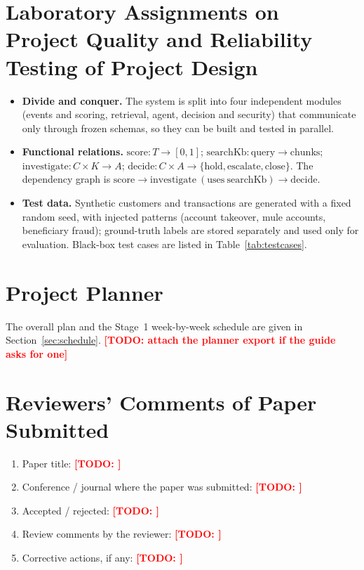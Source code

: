\documentclass[oneside,a4paper,12pt]{report}
\newcommand{\todo}[1]{\textcolor{red}{\textbf{[TODO: #1]}}}
\begin{document}
\begin{appendices}
\chapter{Laboratory Assignments on Project Quality and Reliability Testing of Project Design}
\begin{itemize}
\item \textbf{Divide and conquer.} The system is split into four independent modules (events and scoring, retrieval, agent, decision and security) that communicate only through frozen schemas, so they can be built and tested in parallel.
\item \textbf{Functional relations.} $\mathrm{score}: T\to[0,1]$; $\mathrm{searchKb}: \text{query}\to \text{chunks}$; $\mathrm{investigate}: C\times K \to A$; $\mathrm{decide}: C\times A \to \{\text{hold},\text{escalate},\text{close}\}$. The dependency graph is $\mathrm{score} \rightarrow \mathrm{investigate}\ (\text{uses}\ \mathrm{searchKb}) \rightarrow \mathrm{decide}$.
\item \textbf{Test data.} Synthetic customers and transactions are generated with a fixed random seed, with injected patterns (account takeover, mule accounts, beneficiary fraud); ground-truth labels are stored separately and used only for evaluation. Black-box test cases are listed in Table~\ref{tab:testcases}.
\end{itemize}

\chapter{Project Planner}
\label{app:plan}
The overall plan and the Stage~1 week-by-week schedule are given in Section~\ref{sec:schedule}. \todo{attach the planner export if the guide asks for one}

\chapter{Reviewers' Comments of Paper Submitted}
\begin{enumerate}
\item Paper title: \todo{}
\item Conference / journal where the paper was submitted: \todo{}
\item Accepted / rejected: \todo{}
\item Review comments by the reviewer: \todo{}
\item Corrective actions, if any: \todo{}
\end{enumerate}


\end{appendices}
\end{document}
